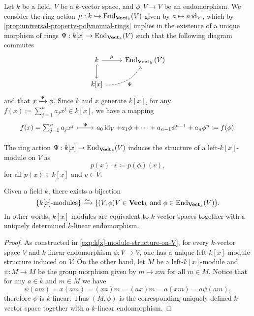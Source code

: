 \begin{example}
\label{exp:k[x]-module-structure-on-V}
Let \(k\) be a field, \(V\) be a \(k\)-vector space, and \(\phi: V \to V\) be an
endomorphism. We consider the ring action \(\mu: k \hookrightarrow \operatorname{End}_{{\textbf{Vect}}_k}(V)\)
given by \(a \mapsto a \operatorname{id}_V\), which by
\cref{prop:universal-property-polynomial-rings} implies in the existence of a
unique morphism of rings \(\Psi: k[x] \to \operatorname{End}_{{\textbf{Vect}}_k}(V)\) such that the
following diagram commutes
\[
\begin{tikzcd}
k \ar[d, hook] \ar[r, "\mu"] & \End_{\Vect_k}{(V)} \\
k[x] \ar[ru, dashed, bend right, "\Psi"']&
\end{tikzcd}
\]
and that \(x \xmapsto{\Psi} \phi\). Since \(k\) and \(x\) generate \(k[x]\), for
any \(f(x) \coloneq \sum_{j=1}^n a_j x^j \in k[x]\), we have a mapping
\[
\begin{tikzcd}
f(x) = \sum_{j=1}^n a_j x^j \ar[r, mapsto, "\Psi"]
& a_0 \Id_V + a_1 \phi + \dots + a_{n-1} \phi^{n-1} + a_n \phi^n \coloneq f(\phi).
\end{tikzcd}
\]

The ring action \(\Psi: k[x] \to \operatorname{End}_{{\textbf{Vect}}_k}(V)\) induces the structure of a
left-\(k[x]\)-module on \(V\) as
\[
p(x) \cdot v \coloneq p(\phi)(v),
\]
for all \(p(x) \in k[x]\) and \(v \in V\).
\end{example}

\begin{corollary}
\label{cor:k[x]-are-vector-spaces-with-endo}
Given a field \(k\), there exists a bijection
\[
\{k[x]\text{-modules}\} \isoto
\{(V, \phi) \colon V \in \Vect_k \text{ and } \phi \in \End_{\Vect_k}(V)\}.
\]
In other words, \(k[x]\)-modules are equivalent to \(k\)-vector spaces together
with a uniquely determined \(k\)-linear endomorphism.
\end{corollary}

\begin{proof}
As constructed in \cref{exp:k[x]-module-structure-on-V}, for every \(k\)-vector
space \(V\) and \(k\)-linear endomorphism \(\phi: V \to V\), one has a unique
left-\(k[x]\)-module structure induced on \(V\). On the other hand, let \(M\) be
a left-\(k[x]\)-module and \(\psi: M \to M\) be the group morphism given by
\(m \mapsto x m\) for all \(m \in M\). Notice that for any \(a \in k\) and
\(m \in M\) we have
\[
\psi(a m) = x (a m) = (x a) m = (a x) m = a (x m) = a \psi(a m),
\]
therefore \(\psi\) is \(k\)-linear. Thus \((M, \phi)\) is the corresponding
uniquely defined \(k\)-vector space together with a \(k\)-linear endomorphism.
\end{proof}

